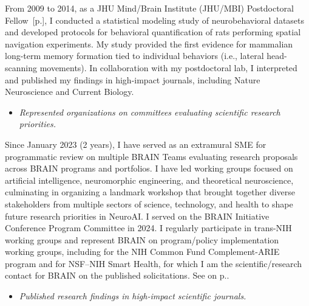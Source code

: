 \documentclass[10pt]{article}
\newcommand{\see}[1]{[\textcolor{hopkinsblue}{p.\pageref{sec:#1}}]}
\newcommand{\cf}[1]{\textcolor{hopkinsblue}{See \emph{\nameref{sec:#1}} on p.\pageref{sec:#1}}}
\begin{document}
From 2009 to 2014, as a JHU Mind/Brain Institute (JHU/MBI) Postdoctoral
Fellow~\see{job3}, I conducted a statistical modeling study of neurobehavioral
datasets and developed protocols for behavioral quantification of rats
performing spatial navigation experiments. My study provided the first evidence
for mammalian long-term memory formation tied to individual behaviors (i.e.,
lateral head-scanning movements). In collaboration with my postdoctoral lab, I
interpreted and published my findings in high-impact journals, including Nature
Neuroscience and Current Biology.
%
%

\begin{itemize}
  \color{hopkinsblue}
  \item \emph{Represented organizations on committees evaluating scientific
research priorities.}
\end{itemize}

Since January 2023 (2 years), I have served as an extramural SME for
programmatic review on multiple BRAIN Teams evaluating research proposals
across BRAIN programs and portfolios. I have led working groups focused on
artificial intelligence, neuromorphic engineering, and theoretical neuroscience,
culminating in organizing a landmark workshop that brought together diverse
stakeholders from multiple sectors of science, technology, and health to
shape future research priorities in NeuroAI. I served on the BRAIN Initiative
Conference Program Committee in 2024. I regularly participate in trans-NIH
working groups and represent BRAIN on program/policy implementation working
groups, including for the NIH Common Fund Complement-ARIE program and for
NSF--NIH Smart Health, for which I am the scientific/research contact for BRAIN
on the published solicitations. \cf{jobobd}.

\begin{itemize}
  \color{hopkinsblue}
  \item \emph{Published research findings in high-impact scientific journals.}
\end{itemize}
\end{document}
